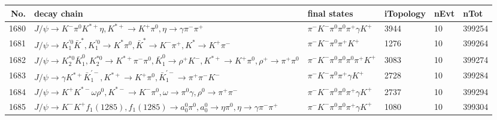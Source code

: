 \begin{table}[htbp] 
\begin{center}
\begin{small}
\begin{tabular}{rlllll}\hline\hline
 No. & decay chain & final states &  iTopology & nEvt & nTot \\\hline
1680&$J/\psi       \rightarrow K^{-}          \pi^{0}        K^{*+}         \eta          , K^{*+}          \rightarrow K^{+}          \pi^{0}        , \eta           \rightarrow \gamma       \pi^{-}        \pi^{+}        $&$\pi^{-}        K^{-}          \pi^{0}        \pi^{0}        \pi^{+}        \gamma       K^{+}          $& 3944&   10&399254\\
1681&$J/\psi       \rightarrow K_1^{'0}      \bar{K}^{*}   , K_1^{'0}       \rightarrow K^{*}          \pi^{0}        , \bar{K}^{*}    \rightarrow K^{-}          \pi^{+}        , K^{*}           \rightarrow K^{+}          \pi^{-}        $&$\pi^{-}        K^{-}          \pi^{0}        \pi^{+}        K^{+}          $& 1276&   10&399264\\
1682&$J/\psi       \rightarrow K_2^{*0}       \bar{K}_1^{0} , K_2^{*0}        \rightarrow K^{*+}         \pi^{-}        \pi^{0}        , \bar{K}_1^{0}  \rightarrow \rho^{+}      K^{-}          , K^{*+}          \rightarrow K^{+}          \pi^{0}        , \rho^{+}       \rightarrow \pi^{+}        \pi^{0}        $&$\pi^{-}        K^{-}          \pi^{0}        \pi^{0}        \pi^{0}        \pi^{+}        K^{+}          $& 3083&   10&399274\\
1683&$J/\psi       \rightarrow \gamma       K^{*+}         \bar{K}_1^{'-}, K^{*+}          \rightarrow K^{+}          \pi^{0}        , \bar{K}_1^{'-} \rightarrow \pi^{+}        \pi^{-}        K^{-}          $&$\pi^{-}        K^{-}          \pi^{0}        \pi^{+}        \gamma       K^{+}          $& 2728&   10&399284\\
1684&$J/\psi       \rightarrow K^{+}          K^{*-}         \omega         \rho^{0}      , K^{*-}          \rightarrow K^{-}          \pi^{0}        , \omega          \rightarrow \pi^{0}        \gamma       , \rho^{0}       \rightarrow \pi^{+}        \pi^{-}        $&$\pi^{-}        K^{-}          \pi^{0}        \pi^{0}        \pi^{+}        \gamma       K^{+}          $& 2737&   10&399294\\
1685&$J/\psi       \rightarrow K^{-}          K^{+}          f_{1}(1285)    , f_{1}(1285)     \rightarrow a_{0}^{0}      \pi^{0}        , a_{0}^{0}       \rightarrow \eta          \pi^{0}        , \eta           \rightarrow \gamma       \pi^{-}        \pi^{+}        $&$\pi^{-}        K^{-}          \pi^{0}        \pi^{0}        \pi^{+}        \gamma       K^{+}          $& 1080&   10&399304\\

\end{tabular}
\end{small}
\end{center}
\end{table}
